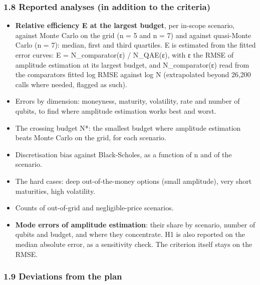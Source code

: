 \documentclass[
  10pt,
]{article}
\providecommand{\tightlist}{%
  \setlength{\itemsep}{0pt}\setlength{\parskip}{0pt}}
\begin{document}
\hypertarget{18-reported-analyses-in-addition-to-the-criteria}{%
\subsubsection{1.8 Reported analyses (in addition to the
criteria)}\label{18-reported-analyses-in-addition-to-the-criteria}}

\begin{itemize}
\tightlist
\item
  \textbf{Relative efficiency E at the largest budget}, per in-scope
  scenario, against Monte Carlo on the grid (n = 5 and n = 7) and
  against quasi-Monte Carlo (n = 7): median, first and third quartiles.
  E is estimated from the fitted error curves: E = N\_comparator(ε) /
  N\_QAE(ε), with ε the RMSE of amplitude estimation at its largest
  budget, and N\_comparator(ε) read from the
  comparator\textquotesingle s fitted log RMSE against log N
  (extrapolated beyond 26,200 calls where needed, flagged as such).
\item
  Errors by dimension: moneyness, maturity, volatility, rate and number
  of qubits, to find where amplitude estimation works best and worst.
\item
  The crossing budget N*: the smallest budget where amplitude estimation
  beats Monte Carlo on the grid, for each scenario.
\item
  Discretisation bias against Black-Scholes, as a function of n and of
  the scenario.
\item
  The hard cases: deep out-of-the-money options (small amplitude), very
  short maturities, high volatility.
\item
  Counts of out-of-grid and negligible-price scenarios.
\item
  \textbf{Mode errors of amplitude estimation}: their share by scenario,
  number of qubits and budget, and where they concentrate. H1 is also
  reported on the median absolute error, as a sensitivity check. The
  criterion itself stays on the RMSE.
\end{itemize}

\hypertarget{19-deviations-from-the-plan}{%
\subsubsection{1.9 Deviations from the
plan}\label{19-deviations-from-the-plan}}
\end{document}
